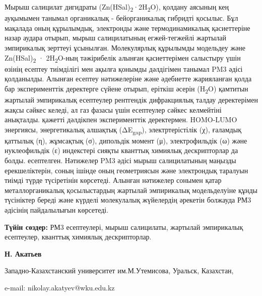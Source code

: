 Мырыш салицилат дигидраты
(Zn(HSal)\textsubscript{2}·2H\textsubscript{2}O), қолдану аясының кең
ауқымымен танымал органикалық - бейорганикалық гибридті қосылыс. Бұл
мақалада оның құрылымдық, электронды және термодинамикалық қасиеттеріне
назар аудара отырып, мырыш салицилатының егжей-тегжейлі жартылай
эмпирикалық зерттеуі ұсынылған. Молекулярлық құрылымды модельдеу және
Zn(HSal)\textsubscript{2} · 2H\textsubscript{2}O-ның тәжірибелік алынған
қасиеттерімен салыстыру үшін өзінің есептеу тиімділігі мен ақылға
қонымды дәлдігімен танымал PM3 әдісі қолданылды. Алынған есептеу
нәтижелеріне және әдебиетте жарияланған қолда бар эксперименттік
деректерге сүйене отырып, еріткіш әсерін (H\textsubscript{2}O) қамтитын
жартылай эмпирикалық есептеулер рентгендік дифракциялық талдау
деректерімен жақсы сәйкес келеді, ал газ фазасы үшін есептеулер сәйкес
келмейтіні анықталды. қажетті дәлдікпен эксперименттік деректермен.
HOMO-LUMO энергиясы, энергетикалық алшақтық (ΔE\textsubscript{gap}),
электртерістілік (χ), ғаламдық қаттылық (η), жұмсақтық (σ), дипольдік
момент (μ), электрофильдік (ω) және нуклеофильдік (ε) индекстері сияқты
кванттық химиялық дескрипторлар да болды. есептелген. Нәтижелер PM3
әдісі мырыш салицилатының маңызды ерекшеліктерін, соның ішінде оның
геометриясын және электрондық таралуын тиімді түрде түсіретінін
көрсетеді. Алынған нәтижелер сонымен қатар металлорганикалық
қосылыстардың жартылай эмпирикалық модельделуіне құнды түсініктер береді
және күрделі молекулалық жүйелердің әрекетін болжауда РМ3 әдісінің
пайдалылығын көрсетеді.

{\bfseries Түйін сөздер:} РМ3 есептеулері, мырыш салицилаты, жартылай
эмпирикалық есептеулер, кванттық химиялық дескрипторлар.


\begin{center}
{\bfseries Н. Акатьев}

Западно-Казахстанский университет им.М.Утемисова, Уральск, Казахстан,

e-mail: nikolay.akatyev@wku.edu.kz
\end{center}

